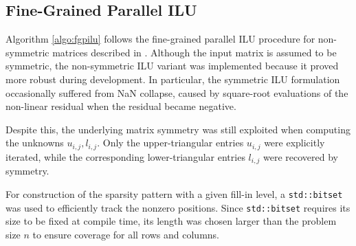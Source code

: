 \subsection{Fine-Grained Parallel ILU}
\label{sec:fine-grain-parall-1}

Algorithm \ref{algo:fgpilu} follows the fine-grained parallel ILU procedure for
non-symmetric matrices described in \cite{chow_fine-grained_2015}. Although the
input matrix is assumed to be symmetric, the non-symmetric ILU variant was
implemented because it proved more robust during development. In particular, the
symmetric ILU formulation occasionally suffered from NaN collapse, caused by
square-root evaluations of the non-linear residual when the residual became
negative.

Despite this, the underlying matrix symmetry was still exploited when computing
the unknowns \(u_{i,j}, l_{i,j}\). Only the upper-triangular entries \(u_{i,j}\)
were explicitly iterated, while the corresponding lower-triangular entries
\(l_{i,j}\) were recovered by symmetry.

For construction of the sparsity pattern with a given fill-in level, a
\texttt{std::bitset} was used to efficiently track the nonzero positions. Since
\texttt{std::bitset} requires its size to be fixed at compile time, its length was
chosen larger than the problem size \(n\) to ensure coverage for all rows and
columns.

